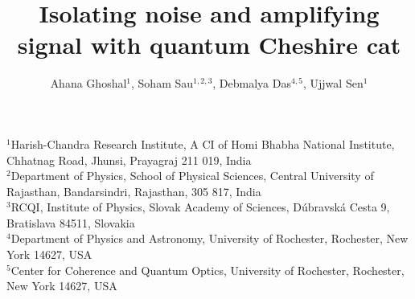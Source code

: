 \documentclass[aps,pra,showpacs,twoside,twocolumn,10pt]{revtex4-1}
\begin{document}
\title{%
Isolating noise and amplifying signal with quantum Cheshire cat}
\author{Ahana Ghoshal$^1$, Soham Sau$^{1,2,3}$, Debmalya Das$^{4,5}$, Ujjwal Sen$^1$}
\affiliation
{$^1$Harish-Chandra Research Institute,  A CI of Homi Bhabha National Institute, Chhatnag Road, Jhunsi, Prayagraj 211 019, India\\
$^2$Department of Physics, School of Physical Sciences, Central University of Rajasthan, Bandarsindri, Rajasthan, 305 817, India\\
$^3$RCQI, Institute of Physics, Slovak Academy of Sciences, Dúbravská Cesta 9, Bratislava 84511, Slovakia \\
$^4$Department of Physics and Astronomy, University of Rochester, Rochester, New York 14627, USA\\
$^5$Center for Coherence and Quantum Optics, University of Rochester, Rochester, New York 14627, USA}
\end{document}
